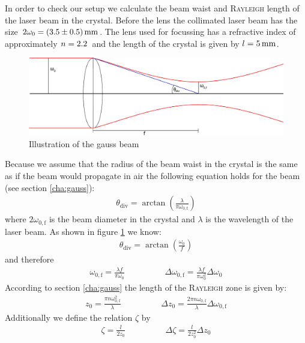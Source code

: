 \documentclass{protokoll_en}
\begin{document}
In order to check our setup we calculate the beam waist and \textsc{Rayleigh} length of the laser beam in the crystal. Before the lens the collimated laser beam has the size $2\omega_0 = \unit[(3.5 \pm 0.5)]{mm}$. The lens used for focussing has a refractive index of approximately $n = \unit[2.2]{}$ and the length of the crystal is given by $l=\unit[5]{mm}$.
\begin{figure}[H]
  \centering
  \includegraphics[width=1.0\textwidth]{graphics/ana_gauss}
  \caption{Illustration of the gauss beam}
  \label{fig:ana_gauss}
\end{figure}
Because we assume that the radius of the beam waist in the crystal is the same as if the beam would propagate in air the following equation holds for the beam (see section \ref{cha:gauss}):
\begin{align*}
\theta_\textrm{div} = \arctan\left(\frac{\lambda}{\pi\omega_{0,\textrm{f}}}\right)
\end{align*}
where $2\omega_{0,\textrm{f}}$ is the beam diameter in the crystal and $\lambda$ is the wavelength of the laser beam. As shown in figure \ref{fig:ana_gauss} we know:
\begin{align*}
\theta_\textrm{div} = \arctan\left(\frac{\omega_0}{f}\right)
\end{align*}
and therefore
\begin{align}
\omega_{0,\textrm{f}} = \frac{\lambda f}{\pi\omega_0} \hspace{2cm} \Delta \omega_{0,\textrm{f}} = \frac{\lambda f}{\pi\omega_0^2}\Delta \omega_0
\end{align}
According to section \ref{cha:gauss} the length of the \textsc{Rayleigh} zone is given by:
\begin{align}
z_0 = \frac{\pi n\omega_{0,\textrm{f}}^2}{\lambda} \hspace{2cm} \Delta z_0 = \frac{2\pi n\omega_{0,\textrm{f}}}{\lambda}\Delta \omega_{0,\textrm{f}}
\end{align}
Additionally we define the relation $\zeta$ by
\begin{align}
\zeta = \frac{l}{2z_0} \hspace{2cm} \Delta \zeta = \frac{l}{2z_0^2}\Delta z_0
\end{align}
\end{document}
